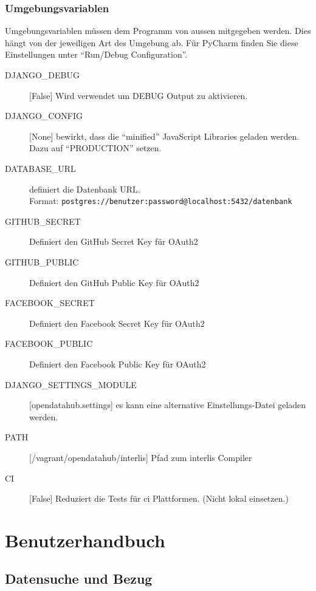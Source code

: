 \subsection{Umgebungsvariablen} \label{sec:sd:umgebungsvariablen}
Umgebungsvariablen müssen dem Programm von aussen mitgegeben werden. Dies hängt von der jeweiligen Art des Umgebung ab. Für PyCharm finden Sie diese Einstellungen unter ``Run/Debug Configuration''.


\begin{description}
\item[DJANGO\_DEBUG]{[}False{]} Wird verwendet um DEBUG Output zu aktivieren. 
\item[DJANGO\_CONFIG]{[}None{]} bewirkt, dass die ``minified'' JavaScript Libraries geladen werden. Dazu auf ``PRODUCTION'' setzen.
\item[DATABASE\_URL] definiert die Datenbank URL. \\Format: \texttt{postgres://benutzer:password@localhost:5432/datenbank}
\item[GITHUB\_SECRET] Definiert den GitHub Secret Key für OAuth2
\item[GITHUB\_PUBLIC] Definiert den GitHub Public Key für OAuth2
\item[FACEBOOK\_SECRET] Definiert den Facebook Secret Key für OAuth2
\item[FACEBOOK\_PUBLIC] Definiert den Facebook Public Key für OAuth2
\item[DJANGO\_SETTINGS\_MODULE]{[}opendatahub.settings{]} es kann eine alternative Einstellungs-Datei geladen werden.
\item[PATH]{[}/vagrant/opendatahub/interlis{]} Pfad zum \gls{interlis} Compiler
\item[CI]{[}False{]} Reduziert die Tests für \acl{ci} Plattformen. (Nicht lokal einsetzen.)
\end{description}
\chapter{Benutzerhandbuch}

\section{Datensuche und Bezug} \label{sec:sd:daten-suchen}


